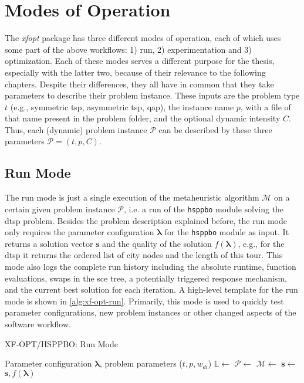 \section{Modes of Operation}
\label{chap:mop}

The \textit{\gls{xfopt}} package has three different modes of operation, each of which uses some part of the above workflows: 1) run, 2) experimentation and 3) optimization. Each of these modes serves a different purpose for the thesis, especially with the latter two, because of their relevance to the following chapters.
Despite their differences, they all have in common that they take parameters to describe their problem instance. These inputs are the problem type $t$ (e.g., symmetric \gls{tsp}, asymmetric \gls{tsp}, \gls{qap}), the instance name $p$, with a file of that name present in the problem folder, and the optional dynamic intensity $C$. Thus, each (dynamic) problem instance $\mathcal{P}$ can be described by these three parameters $\mathcal{P} = \left( t,p,C \right)$.

\subsection{Run Mode}
The run mode is just a single execution of the metaheuristic algorithm $\mathcal{M}$ on a certain given problem instance $\mathcal{P}$, i.e. a run of the \texttt{hsppbo} module solving the \gls{dtsp} problem. Besides the problem description explained before, the run mode only requires the parameter configuration $\mathbf{\lambda}$ for the \texttt{hsppbo} module as input. It returns a solution vector $\mathbf{s}$ and the quality of the solution $f(\mathbf{\lambda})$, e.g., for the \gls{dtsp} it returns the ordered list of city nodes and the length of this tour. This mode also logs the complete run history including the absolute runtime, function evaluations, swaps in the \gls{sce} tree, a potentially triggered response mechanism, and the current best solution for each iteration. 
A high-level template for the run mode is shown in \cref{alg:xf-opt-run}.
Primarily, this mode is used to quickly test parameter configurations, new problem instances or other changed aspects of the software workflow.

\begin{algorithm}
	\caption{XF-OPT/HSPPBO: Run Mode}
	\label{alg:xf-opt-run}
	\begin{algorithmic}
		\Require Parameter configuration $\mathbf{\lambda}$, problem parameters ($t, p, w_{di}$)
		\State $\mathbb{L}  \gets $  
		\State $\mathcal{P}  \gets $ 
		\State $\mathcal{M}  \gets $ 
		\State $\mathbf{s} \gets $ 
		\State {}
		\State \Return $\mathcal{\mathbf{s}}, f(\mathbf{\lambda})$
	\end{algorithmic}
\end{algorithm}


